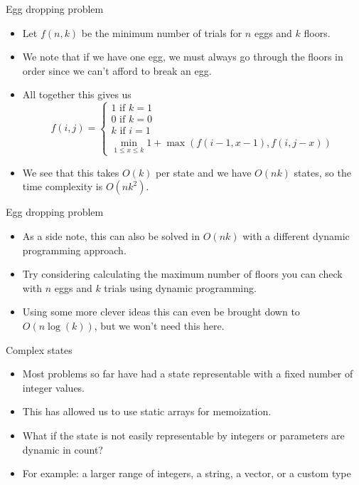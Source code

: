 \documentclass{beamer}
\begin{document}
\begin{frame}[plain]{Egg dropping problem}
    \vspace{10pt}

    \begin{itemize}
        \item Let $f(n, k)$ be the minimum number of trials for $n$ eggs and $k$ floors. 
        \item We note that if we have one egg, we must always go through the floors in order since we can't afford to break an egg.
        \item All together this gives us
        \[f(i, j) = \begin{cases}1 \text{ if } k = 1 \\0 \text{ if } k = 0\\k \text{ if } i = 1\\ \min_{1 \leq x \leq k} 1 + \max(f(i - 1, x - 1), f(i, j - x))\end{cases}\]
        \item We see that this takes $O(k)$ per state and we have $O(nk)$ states, so the time complexity is $O(nk^2)$.
    \end{itemize}
\end{frame}

\begin{frame}[plain]{Egg dropping problem}
    \vspace{10pt}

    \begin{itemize}
        \item As a side note, this can also be solved in $O(nk)$ with a different dynamic programming approach.
        \item Try considering calculating the maximum number of floors you can check with $n$ eggs and $k$ trials using dynamic programming.
        
        \item Using some more clever ideas this can even be brought down to $O(n\log(k))$, but we won't need this here.
    \end{itemize}
\end{frame}

\begin{frame}[plain]{Complex states}
    \begin{itemize}
        \item Most problems so far have had a state representable with a fixed number of integer values.
        \item This has allowed us to use static arrays for memoization.
        \item What if the state is not easily representable by integers or parameters are dynamic in count?
        \item For example: a larger range of integers, a string, a vector, or a custom type
    \end{itemize}
\end{frame}
\end{document}
